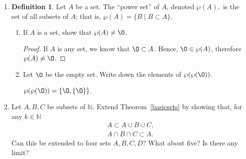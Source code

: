 \documentclass[11pt]{article}
\newcommand{\bbN}{\mathbb{N}}
\renewcommand{\emptyset}{\O}
\theoremstyle{definition}
\newtheorem{definition}[theorem]{Definition}
\numberwithin{equation}{subsection}
\begin{document}
\begin{enumerate}
\begin{proof}
In both cases, $y \in A\cup B$ and $y \in [X \setminus (A \cap B)]$. Since for all $y \in A\oplus B, y \in (A\cup B)\cap [X\setminus(A\cap B)]$, this shows that $A\oplus B \subset (A\cup B)\cap [X\setminus(A\cap B)]$.

Next, we want to show that $(A\cup B)\cap [X\setminus(A\cap B)] \subset A\oplus B$. Consider an element $z \in (A\cup B)\cap [X\setminus(A\cap B)]$. Then, $z \in (A\cup B)$ and $z \in [X\setminus(A\cap B)]$. 

$z \in (A\cup B)$ implies $z \in A$ or $z \in B$. $z \in [X\setminus(A\cap B)]$ implies $z \notin A \cap B$. Therefore, either $z \in A$ and $z \notin B$ in which case $z \in A \setminus B \subset A \oplus B$, or $z \in B$ and $z \notin A$ in which case $z \in B \setminus A \subset A \oplus B$.

Thus, for all $z \in (A\cup B)\cap [X\setminus(A\cap B)]$, $z \in A\oplus B$. Hence, $(A\cup B)\cap [X\setminus(A\cap B)] \subset A\oplus B$.
 
This completes the proof.

\renewcommand\qedsymbol{QED}
\end{proof}

\item
\begin{definition}\label{powersetdef}
	Let $A$ be a set.  The ``power set'' of $A$, denoted $\wp(A),$ is the set of all subsets of $A$; that is, $\wp(A) = \{B \mid B \subset A\}$.
\end{definition}


\begin{enumerate}
	\item If $A$ is a set, show that $\wp(A) \neq \emptyset$.
 \begin{proof}
If $A$ is any set, we know that $\emptyset \subset A$. Hence, $\emptyset \in \wp(A)$, therefore $\wp(A) \not = \emptyset$.
\renewcommand\qedsymbol{QED}
 \end{proof}
	\item Let $\emptyset$ be the empty set.  Write down the elements of $\wp(\wp(\emptyset)).$

$\wp(\wp(\emptyset)) = \{\emptyset, \{\emptyset\}\}$.
\end{enumerate}






\item 


Let $A, B, C$ be subsets of $\bbN$.  Extend Theorem~\ref{basicsets} by showing that, for any $k \in \bbN$
\[\begin{split}
	&A\subset A \cup B \cup C,\\
	&A \cap B \cap C \subset A.
\end{split}
\]
Can this be extended to four sets $A,B,C,D$?  What about five?  Is there any limit?



\end{enumerate}
\end{document}
